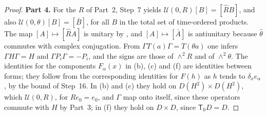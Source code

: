 \documentclass[11pt]{amsart}
\theoremstyle{definition}
\begin{document}
\begin{proof}
\textbf{Part 4.}
For the $R$ of Part~2, Step~7 yields $\mathcal U(0,R)[B]=[\hat RB]$, and also $\mathcal U(0,\theta)[B]=[\bar B]$, for all $B$ in the total set of time-ordered products.
The map $[A]\mapsto[\hat RA]$ is unitary by \cite[Proposition~14.47\,(a)]{QEDII}, and $[A]\mapsto[\bar A]$ is antiunitary because $\hat\theta$ commutes with complex conjugation.
From $\Gamma T(a)\Gamma=T(\theta a)$ one infers $\Gamma H\Gamma=H$ and $\Gamma P_i\Gamma=-P_i$, and the signs are those of $\wedge^2R$ and of $\wedge^2\theta$.
The identities for the components $F_\alpha(x)$ in (b), (c) and (f) are identities between forms; they follow from the corresponding identities for $F(h)$ as $h$ tends to $\delta_xe_\alpha$, by the bound of Step~16.
In (b) and (c) they hold on $D(H^2)\times D(H^2)$, which $\mathcal U(0,R)$, for $Re_0=e_0$, and $\Gamma$ map onto itself, since these operators commute with $H$ by Part~3; in (f) they hold on $D\times D$, since $\mathsf T_0D=D$.


\end{proof}
\end{document}
